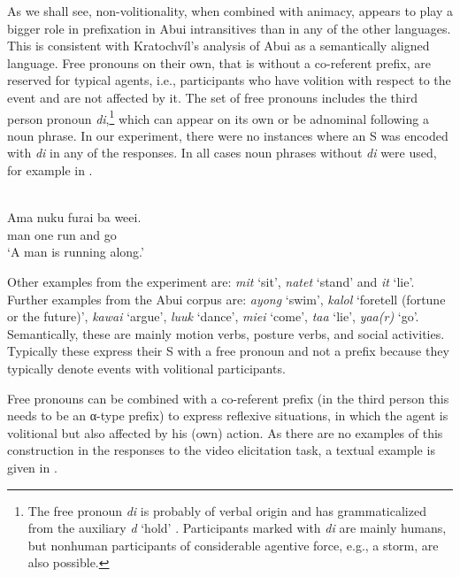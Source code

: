 As we shall see, non-volitionality, when combined with animacy, appears to play a bigger role in prefixation in Abui intransitives than in any of the other languages. This is consistent with Kratochv\'il's analysis of Abui as a semantically aligned language. Free pronouns on their own, that is without a co-referent prefix, are reserved for typical agents, i.e., participants who have volition with respect to the event and are not affected by it. The set of free pronouns includes the third person pronoun \textit{di},\footnote{The free pronoun \textit{di} is probably of verbal origin and has grammaticalized from the auxiliary \textit{d} `hold' \citep{Kratochvil2011transitivity}. Participants marked with \textit{di} are mainly humans, but nonhuman participants of considerable agentive force, e.g., a storm, are also possible.} which can appear on its own or be adnominal following a noun phrase. In our experiment, there were no instances where an S was encoded with \textit{di} in any of the responses. In all cases noun phrases without \textit{di} were used, for example in .


\ea%
\label{bkm:Ref283206980}
 \\ 
\gll    Ama  nuku  furai  ba  weei.\\  
      man  one  run  and  go\\
\glt  `A man is running along.' 
\z







Other examples from the experiment are: \textit{mit} `sit', \textit{natet} `stand' and \textit{it} `lie'. Further examples from the Abui corpus are: \textit{ayong} `swim', \textit{kalol} `foretell (fortune or the future)', \textit{kawai} `argue', \textit{luuk} `dance', \textit{miei} `come', \textit{taa} `lie', \textit{yaa(r)} `go'. Semantically, these are mainly motion verbs, posture verbs, and social activities. Typically these express their S with a free pronoun and not a prefix because they typically denote events with volitional participants. 

Free pronouns can be combined with a co-referent prefix (in the third person this needs to be an α-type prefix) to express reflexive situations, in which the agent is volitional but also affected by his (own) action. As there are no examples of this construction in the responses to the video elicitation task, a textual example is given in .


